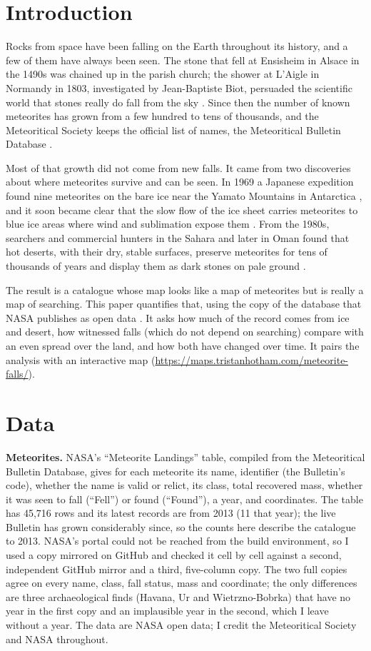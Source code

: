 \documentclass[11pt,a4paper]{article}
\begin{document}
\section{Introduction}
Rocks from space have been falling on the Earth throughout its history, and a few of them have always been seen. The stone that fell at Ensisheim in Alsace in the 1490s was chained up in the parish church; the shower at L'Aigle in Normandy in 1803, investigated by Jean-Baptiste Biot, persuaded the scientific world that stones really do fall from the sky \citep{burke}. Since then the number of known meteorites has grown from a few hundred to tens of thousands, and the Meteoritical Society keeps the official list of names, the Meteoritical Bulletin Database \citep{metbull}.

Most of that growth did not come from new falls. It came from two discoveries about where meteorites survive and can be seen. In 1969 a Japanese expedition found nine meteorites on the bare ice near the Yamato Mountains in Antarctica \citep{yoshida}, and it soon became clear that the slow flow of the ice sheet carries meteorites to blue ice areas where wind and sublimation expose them \citep{harvey}. From the 1980s, searchers and commercial hunters in the Sahara and later in Oman found that hot deserts, with their dry, stable surfaces, preserve meteorites for tens of thousands of years and display them as dark stones on pale ground \citep{bland}.

The result is a catalogue whose map looks like a map of meteorites but is really a map of searching. This paper quantifies that, using the copy of the database that NASA publishes as open data \citep{nasa}. It asks how much of the record comes from ice and desert, how witnessed falls (which do not depend on searching) compare with an even spread over the land, and how both have changed over time. It pairs the analysis with an interactive map (\url{https://maps.tristanhotham.com/meteorite-falls/}).

\section{Data}
\textbf{Meteorites.} NASA's ``Meteorite Landings'' table, compiled from the Meteoritical Bulletin Database, gives for each meteorite its name, identifier (the Bulletin's code), whether the name is valid or relict, its class, total recovered mass, whether it was seen to fall (``Fell'') or found (``Found''), a year, and coordinates. The table has 45,716 rows and its latest records are from 2013 (11 that year); the live Bulletin has grown considerably since, so the counts here describe the catalogue to 2013. NASA's portal could not be reached from the build environment, so I used a copy mirrored on GitHub and checked it cell by cell against a second, independent GitHub mirror and a third, five-column copy. The two full copies agree on every name, class, fall status, mass and coordinate; the only differences are three archaeological finds (Havana, Ur and Wietrzno-Bobrka) that have no year in the first copy and an implausible year in the second, which I leave without a year. The data are NASA open data; I credit the Meteoritical Society and NASA throughout.
\end{document}

